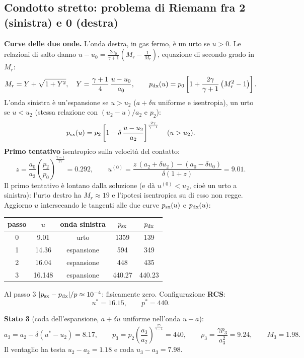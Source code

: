 \documentclass[11pt,a4paper]{article}
\newcommand{\uma}{u-a}
\newcommand{\Mr}{M_{r}}
\begin{document}
\subsection{Condotto stretto: problema di Riemann fra 2 (sinistra) e 0 (destra)}
\textbf{Curve delle due onde.} L'onda destra, in gas fermo, è un urto se $u>0$. Le relazioni di salto danno
$u-u_0=\frac{2a_0}{\gamma+1}\left(\Mr-\frac1{\Mr}\right)$, equazione di secondo grado in $\Mr$:
\[
  \Mr=Y+\sqrt{1+Y^2},\quad Y=\frac{\gamma+1}{4}\,\frac{u-u_0}{a_0},\qquad
  p_{\rm dx}(u)=p_0\left[1+\frac{2\gamma}{\gamma+1}\left(\Mr^2-1\right)\right].
\]
L'onda sinistra è un'espansione se $u>u_2$ ($a+\delta u$ uniforme e isentropia), un urto se $u<u_2$ (stessa
relazione con $(u_2-u)/a_2$ e $p_2$):
\[
  p_{\rm sx}(u)=p_2\left[1-\delta\,\frac{u-u_2}{a_2}\right]^{\frac{2\gamma}{\gamma-1}}\quad(u>u_2).
\]
\textbf{Primo tentativo} isentropico sulla velocità del contatto:
\[
  z=\frac{a_0}{a_2}\left(\frac{p_2}{p_0}\right)^{\frac{\gamma-1}{2\gamma}}=\num{0.292},\qquad
  u^{(0)}=\frac{z\,(a_2+\delta u_2)-(a_0-\delta u_0)}{\delta(1+z)}=\num{9.01}.
\]
Il primo tentativo è lontano dalla soluzione (e dà $u^{(0)}<u_2$, cioè un urto a sinistra): l'urto destro ha
$\Mr\approx19$ e l'ipotesi isentropica su di esso non regge. Aggiorno $u$ intersecando le tangenti alle due
curve $p_{\rm sx}(u)$ e $p_{\rm dx}(u)$:
\begin{table}[H]
  \centering
  \begin{tabular}{ccccc}
    \toprule
    passo & $u$ & onda sinistra & $p_{\rm sx}$ & $p_{\rm dx}$ \\
    \midrule
    0 & \num{9.01}  & urto        & \num{1359} & \num{139} \\
    1 & \num{14.36} & espansione  & \num{594}  & \num{349} \\
    2 & \num{16.04} & espansione  & \num{448}  & \num{435} \\
    3 & \num{16.148} & espansione & \num{440.27} & \num{440.23} \\
    \bottomrule
  \end{tabular}
\end{table}
Al passo 3 $|p_{\rm sx}-p_{\rm dx}|/p\approx10^{-4}$: fisicamente zero. Configurazione \textbf{RCS}:
\[
  u^*=\num{16.15},\qquad p^*=\num{440}.
\]

\textbf{Stato 3} (coda dell'espansione, $a+\delta u$ uniforme nell'onda $\uma$):
\[
  a_3=a_2-\delta\left(u^*-u_2\right)=\num{8.17},\qquad
  p_3=p_2\left(\frac{a_3}{a_2}\right)^{\frac{2\gamma}{\gamma-1}}=\num{440},\qquad
  \rho_3=\frac{\gamma p_3}{a_3^2}=\num{9.24},\qquad M_3=\num{1.98}.
\]
Il ventaglio ha testa $u_2-a_2=\num{1.18}$ e coda $u_3-a_3=\num{7.98}$.
\end{document}
